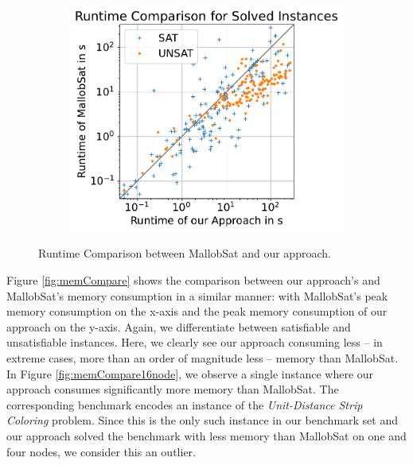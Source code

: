 \documentclass[12pt,a4paper,twoside]{scrartcl}
\numberwithin{equation}{section}
\begin{document}
\begin{figure}[!h]
\begin{subfigure}[c]{.45\textwidth}
  \end{subfigure}
  \begin{subfigure}[c]{.45\textwidth}
    \center
    \includegraphics[scale=.45]{plots/square_runtime_compare/square_runtime_16node.pdf}
    \label{fig:runtimeCompare16node}
  \end{subfigure}
  \caption{Runtime Comparison between MallobSat and our approach.}
  \label{fig:runtimeCompare}
\end{figure}

Figure \ref{fig:memCompare} shows the comparison between our approach's and MallobSat's memory consumption in a similar manner: with MallobSat's peak memory consumption on the x-axis and the peak memory consumption of our approach on the y-axis. Again, we differentiate between satisfiable and unsatisfiable instances. Here, we clearly see our approach consuming less -- in extreme cases, more than an order of magnitude less -- memory than MallobSat. In Figure \ref{fig:memCompare16node}, we observe a single instance where our approach consumes significantly more memory than MallobSat. The corresponding benchmark encodes an instance of the \textit{Unit-Distance Strip Coloring} problem. Since this is the only such instance in our benchmark set and our approach solved the benchmark with less memory than MallobSat on one and four nodes, we consider this an outlier.
\end{document}
